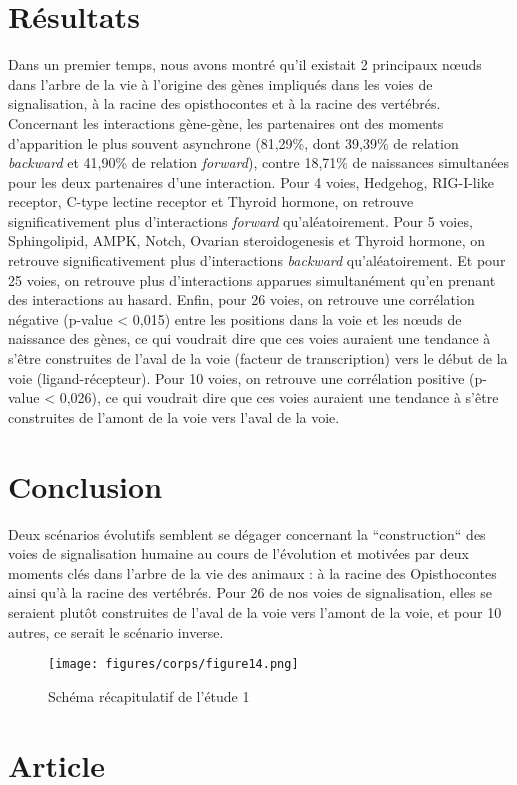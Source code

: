 \section{Résultats}
\par Dans un premier temps, nous avons montré qu’il existait 2 principaux nœuds dans l’arbre de la vie à l’origine des gènes impliqués dans les voies de signalisation, à la racine des opisthocontes et à la racine des vertébrés. Concernant les interactions gène-gène, les partenaires ont des moments d’apparition le plus souvent asynchrone (81,29\%, dont 39,39\% de relation \textit{backward} et 41,90\% de relation \textit{forward}), contre 18,71\% de naissances simultanées pour les deux partenaires d’une interaction. Pour 4 voies, Hedgehog, RIG-I-like receptor, C-type lectine receptor et Thyroid hormone, on retrouve significativement plus d’interactions \textit{forward} qu’aléatoirement. Pour 5 voies, Sphingolipid, AMPK, Notch, Ovarian steroidogenesis et Thyroid hormone, on retrouve significativement plus d’interactions \textit{backward} qu’aléatoirement. Et pour 25 voies, on retrouve plus d’interactions apparues simultanément qu’en prenant des interactions au hasard. Enfin, pour 26 voies, on retrouve une corrélation négative (p-value < 0,015) entre les positions dans la voie et les nœuds de naissance des gènes, ce qui voudrait dire que ces voies auraient une tendance à s’être construites de l’aval de la voie (facteur de transcription) vers le début de la voie (ligand-récepteur). Pour 10 voies, on retrouve une corrélation positive (p-value < 0,026), ce qui voudrait dire que ces voies auraient une tendance à s’être construites de l’amont de la voie vers l’aval de la voie. 

\section{Conclusion}
\par Deux scénarios évolutifs semblent se dégager concernant la “construction“ des voies de signalisation humaine au cours de l’évolution et motivées par deux moments clés dans l’arbre de la vie des animaux : à la racine des Opisthocontes ainsi qu’à la racine des vertébrés. Pour 26 de nos voies de signalisation, elles se seraient plutôt construites de l’aval de la voie vers l’amont de la voie, et pour 10 autres, ce serait le scénario inverse.

\begin{figure}[H]
    \centering
    \texttt{[image: figures/corps/figure14.png]}
    \caption{Schéma récapitulatif de l'étude 1}
    \label{fig:14_schéma1}
\end{figure}

\section{Article}\label{art1}



